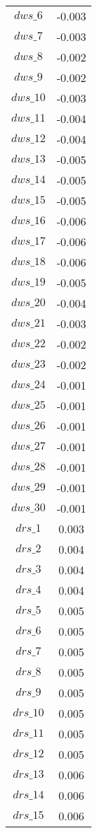 \begin{center}
\begin{longtable}{cc}
$dws\_6$ 	 & 	 -0.003 \\
$dws\_7$ 	 & 	 -0.003 \\
$dws\_8$ 	 & 	 -0.002 \\
$dws\_9$ 	 & 	 -0.002 \\
$dws\_10$ 	 & 	 -0.003 \\
$dws\_11$ 	 & 	 -0.004 \\
$dws\_12$ 	 & 	 -0.004 \\
$dws\_13$ 	 & 	 -0.005 \\
$dws\_14$ 	 & 	 -0.005 \\
$dws\_15$ 	 & 	 -0.005 \\
$dws\_16$ 	 & 	 -0.006 \\
$dws\_17$ 	 & 	 -0.006 \\
$dws\_18$ 	 & 	 -0.006 \\
$dws\_19$ 	 & 	 -0.005 \\
$dws\_20$ 	 & 	 -0.004 \\
$dws\_21$ 	 & 	 -0.003 \\
$dws\_22$ 	 & 	 -0.002 \\
$dws\_23$ 	 & 	 -0.002 \\
$dws\_24$ 	 & 	 -0.001 \\
$dws\_25$ 	 & 	 -0.001 \\
$dws\_26$ 	 & 	 -0.001 \\
$dws\_27$ 	 & 	 -0.001 \\
$dws\_28$ 	 & 	 -0.001 \\
$dws\_29$ 	 & 	 -0.001 \\
$dws\_30$ 	 & 	 -0.001 \\
$drs\_1$ 	 & 	 0.003 \\
$drs\_2$ 	 & 	 0.004 \\
$drs\_3$ 	 & 	 0.004 \\
$drs\_4$ 	 & 	 0.004 \\
$drs\_5$ 	 & 	 0.005 \\
$drs\_6$ 	 & 	 0.005 \\
$drs\_7$ 	 & 	 0.005 \\
$drs\_8$ 	 & 	 0.005 \\
$drs\_9$ 	 & 	 0.005 \\
$drs\_10$ 	 & 	 0.005 \\
$drs\_11$ 	 & 	 0.005 \\
$drs\_12$ 	 & 	 0.005 \\
$drs\_13$ 	 & 	 0.006 \\
$drs\_14$ 	 & 	 0.006 \\
$drs\_15$ 	 & 	 0.006 \\

\end{longtable}
\end{center}
